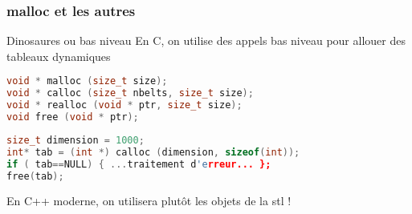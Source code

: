\documentclass{beamer}
\begin{document}
\begin{frame}[fragile=singleslide,shrink=20]
\frametitle{malloc et les autres}

\begin{block}{Dinosaures ou bas niveau}
En C, on utilise des appels bas niveau pour allouer des tableaux dynamiques
\end{block}

\begin{lstlisting}[language=c++]
void * malloc (size_t size);
void * calloc (size_t nbelts, size_t size);
void * realloc (void * ptr, size_t size);
void free (void * ptr);
\end{lstlisting}

\begin{lstlisting}[language=c++]
size_t dimension = 1000;
int* tab = (int *) calloc (dimension, sizeof(int));
if ( tab==NULL) { ...traitement d'erreur... };
free(tab);
\end{lstlisting}

\begin{block}{}
En C++ moderne, on utilisera plutôt les objets de la stl !
\end{block}
\end{frame}
\end{document}
